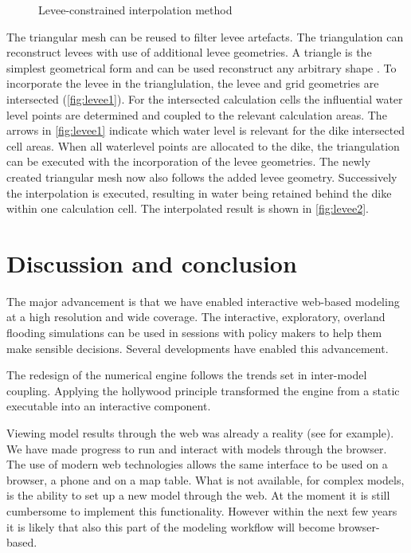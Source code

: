 \documentclass[a4paper]{article}
\begin{document}
\begin{figure}[htbp]
  \caption{Levee-constrained interpolation method}

\end{figure}

The triangular mesh can be reused to filter levee artefacts. The triangulation can reconstruct levees with use of additional levee geometries. A triangle is the simplest geometrical form and can be used reconstruct any arbitrary shape \citep{Welch1994}. To incorporate the levee in the trianglulation, the levee and grid geometries are intersected (\autoref{fig:levee1}). For the intersected calculation cells the influential water level points are determined and coupled to the relevant calculation areas. The arrows in \autoref{fig:levee1} indicate which water level is relevant for the dike intersected cell areas. When all waterlevel points are allocated to the dike, the triangulation can be executed with the incorporation of the levee geometries. The newly created triangular mesh now also follows the added levee geometry. Successively the interpolation is executed, resulting in water being retained behind the dike within one calculation cell. The interpolated result is shown in \autoref{fig:levee2}.



\section{Discussion and conclusion}

The major advancement is that we have enabled interactive web-based modeling at a high resolution and wide coverage.
The interactive, exploratory, overland flooding simulations can be used in sessions with policy makers to help them make sensible decisions. Several developments have enabled this advancement.

The redesign of the numerical engine follows the trends set in inter-model coupling. Applying the hollywood principle transformed the engine from a static executable into an interactive component.

Viewing model results through the web was already a reality (see \citep{Blower2013} for example). We have made progress to run and interact with models through the browser. The use of modern web technologies allows the same interface to be used on a browser, a phone and on a map table. What is not available, for complex models, is the ability to set up a new model through the web. At the moment it is still cumbersome to implement this functionality. However within the next few years it is likely that also this part of the modeling workflow will become browser-based.
\end{document}
